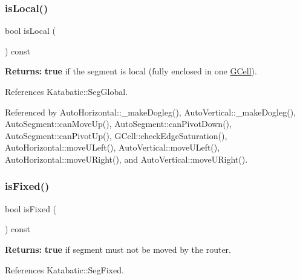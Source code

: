 \mbox{\label{classKatabatic_1_1AutoSegment_add556a145a89fdbcea82346abfb873dc}} 
\subsubsection{\texorpdfstring{is\+Local()}{isLocal()}}
{\footnotesize\ttfamily bool is\+Local (\begin{DoxyParamCaption}{ }\end{DoxyParamCaption}) const\hspace{0.3cm}{\ttfamily [inline]}}

{\bfseries Returns\+:} {\bfseries true} if the segment is local (fully enclosed in one \mbox{\hyperlink{classKatabatic_1_1GCell}{G\+Cell}}). 

References Katabatic\+::\+Seg\+Global.



Referenced by Auto\+Horizontal\+::\+\_\+make\+Dogleg(), Auto\+Vertical\+::\+\_\+make\+Dogleg(), Auto\+Segment\+::can\+Move\+Up(), Auto\+Segment\+::can\+Pivot\+Down(), Auto\+Segment\+::can\+Pivot\+Up(), G\+Cell\+::check\+Edge\+Saturation(), Auto\+Horizontal\+::move\+U\+Left(), Auto\+Vertical\+::move\+U\+Left(), Auto\+Horizontal\+::move\+U\+Right(), and Auto\+Vertical\+::move\+U\+Right().

\mbox{\label{classKatabatic_1_1AutoSegment_afd7362b850709bed8b61c1aa22399f97}} 
\subsubsection{\texorpdfstring{is\+Fixed()}{isFixed()}}
{\footnotesize\ttfamily bool is\+Fixed (\begin{DoxyParamCaption}{ }\end{DoxyParamCaption}) const\hspace{0.3cm}{\ttfamily [inline]}}

{\bfseries Returns\+:} {\bfseries true} if segment must not be moved by the router. 

References Katabatic\+::\+Seg\+Fixed.




